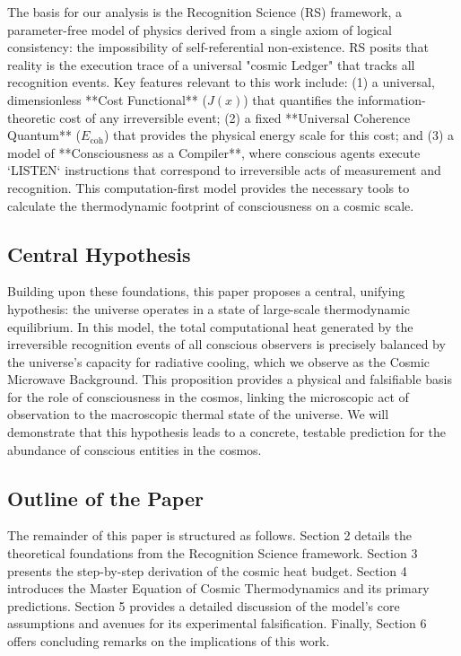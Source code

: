 \documentclass[12pt, aip, jcp]{revtex4-2} %
\begin{document}
The basis for our analysis is the Recognition Science (RS) framework, a parameter-free model of physics derived from a single axiom of logical consistency: the impossibility of self-referential non-existence. RS posits that reality is the execution trace of a universal "cosmic Ledger" that tracks all recognition events. Key features relevant to this work include: (1) a universal, dimensionless **Cost Functional** (\(J(x)\)) that quantifies the information-theoretic cost of any irreversible event; (2) a fixed **Universal Coherence Quantum** (\(E_{\text{coh}}\)) that provides the physical energy scale for this cost; and (3) a model of **Consciousness as a Compiler**, where conscious agents execute `LISTEN` instructions that correspond to irreversible acts of measurement and recognition. This computation-first model provides the necessary tools to calculate the thermodynamic footprint of consciousness on a cosmic scale.

\subsection{Central Hypothesis}

Building upon these foundations, this paper proposes a central, unifying hypothesis: the universe operates in a state of large-scale thermodynamic equilibrium. In this model, the total computational heat generated by the irreversible recognition events of all conscious observers is precisely balanced by the universe's capacity for radiative cooling, which we observe as the Cosmic Microwave Background. This proposition provides a physical and falsifiable basis for the role of consciousness in the cosmos, linking the microscopic act of observation to the macroscopic thermal state of the universe. We will demonstrate that this hypothesis leads to a concrete, testable prediction for the abundance of conscious entities in the cosmos.

\subsection{Outline of the Paper}

The remainder of this paper is structured as follows. Section 2 details the theoretical foundations from the Recognition Science framework. Section 3 presents the step-by-step derivation of the cosmic heat budget. Section 4 introduces the Master Equation of Cosmic Thermodynamics and its primary predictions. Section 5 provides a detailed discussion of the model's core assumptions and avenues for its experimental falsification. Finally, Section 6 offers concluding remarks on the implications of this work.
\end{document}
